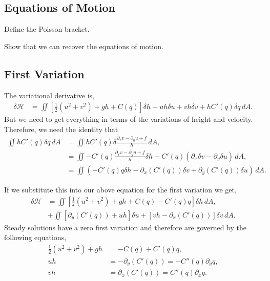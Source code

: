 \documentclass[12pt]{article}
\begin{document}
{    \subsection{Equations of Motion}{
        Define the Poisson bracket.

        Show that we can recover the equations of motion.
    }

    \subsection{First Variation}{
        The variational derivative is,
        \begin{align*}
            \delta \mathcal{H}
            &=  \iint \left[ \frac12  (u^2 + v^2) + g h  + C(q) \right] \delta h   +  uh  \delta u + vh \delta v   + h C'(q) \delta q \, dA.
        \end{align*}
        But we need to get everything in terms of the variations of height and velocity.  Therefore, we need the identity that
        \begin{align*}
            \iint h C'(q) \delta q \, dA
            &= \iint h C'(q) \delta \frac{ \partial_x v - \partial_y u+ f}{h} \, dA, \\
            &= \iint - C'(q) \frac{ \partial_x v - \partial_y u+ f}{h } \delta h + C'(q) \left(  \partial_x \delta v - \partial_y \delta u \right) \, dA, \\
            &= \iint \left( - C'(q) q \delta h - \partial_x ( C'(q) )  \delta v + \partial_y ( C'(q) ) \delta u \right) \, dA.
        \end{align*}

        If we substitute this into our above equation for the first variation we get,
        \begin{align*}
            \delta \mathcal{H}
            & =  \iint \left[ \frac12  (u^2 + v^2) + g h  + C(q)  - C'(q) q\right] \delta h     \, dA, \\
            & +  \iint \left[ \partial_y ( C'(q) ) + u h \right] \delta u  +  \left[ vh - \partial_x ( C'(q) )  \right] \delta v \, dA.
        \end{align*}
        Steady solutions have a zero first variation and therefore are governed by the following equations,
        \begin{align*}
            \frac12  (u^2 + v^2) + g h & = - C(q)  + C'(q) q ,\\
            u h & = - \partial_y ( C'(q) ) = - C''(q) \partial_y q, \\
            vh  & = \partial_x ( C'(q) ) = C''(q) \partial_x q.
        \end{align*}

}}
\end{document}
